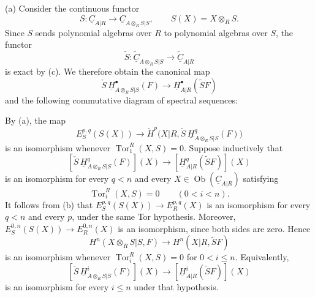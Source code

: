 (a) Consider the continuous functor
\[
 S:\underline C_{A|R}\longrightarrow
 \underline C_{A\otimes_RS|S},
 \qquad S(X)=X\otimes_RS.
\]
Since $S$ sends polynomial algebras over $R$ to polynomial
algebras over $S$, the functor
\[
 \widetilde S:\widetilde{\underline C}_{A\otimes_RS|S}
 \longrightarrow\widetilde{\underline C}_{A|R}
\]
is exact by (c). We therefore obtain the canonical map
\[
 \check S\,\underline H^{\bullet}_{A\otimes_RS|S}(F)
 \longrightarrow
 \underline H^{\bullet}_{A|R}(\widetilde SF)
\]
and the following commutative diagram of spectral sequences:
\begin{center}
\small
{}
\end{center}


By (a), the map
\[
 E_S^{p,q}(S(X))\longrightarrow
 \check H^p\bigl(X|R,
 \check S\,\underline H^q_{A\otimes_RS|S}(F)\bigr)
\]
is an isomorphism whenever
$\operatorname{Tor}_1^R(X,S)=0$. Suppose inductively that
\[
 [\check S\,\underline H^q_{A\otimes_RS|S}(F)](X)
 \longrightarrow
 [\underline H^q_{A|R}(\widetilde SF)](X)
\]
is an isomorphism for every $q<n$ and every
$X\in\operatorname{Ob}(\underline C_{A|R})$ satisfying
\[
 \operatorname{Tor}_i^R(X,S)=0\qquad(0<i<n).
\]
It follows from (b) that
$E_S^{p,q}(S(X))\longrightarrow E_R^{p,q}(X)$ is an isomorphism
for every $q<n$ and every $p$, under the same Tor hypothesis.
Moreover,
$E_S^{0,n}(S(X))\longrightarrow E_R^{0,n}(X)$ is an isomorphism,
since both sides are zero. Hence
\[
 H^n(X\otimes_RS|S,F)
 \longrightarrow H^n(X|R,\widetilde SF)
\]
is an isomorphism whenever
$\operatorname{Tor}_i^R(X,S)=0$ for $0<i\leq n$. Equivalently,
\[
 [\check S\,\underline H^i_{A\otimes_RS|S}(F)](X)
 \longrightarrow
 [\underline H^i_{A|R}(\widetilde SF)](X)
\]
is an isomorphism for every $i\leq n$ under that hypothesis.

